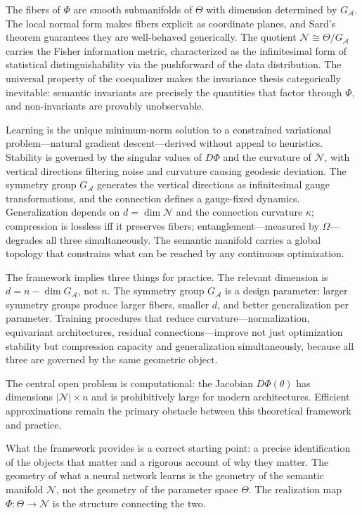 \documentclass[twocolumn,10pt]{article}
\theoremstyle{thmstyle}
\theoremstyle{defstyle}
\begin{document}
The fibers of $\Phi$ are smooth submanifolds of $\Theta$ with dimension
determined by $G_\mathcal{A}$. The local normal form makes fibers
explicit as coordinate planes, and Sard's theorem guarantees they are
well-behaved generically. The quotient $\mathcal{N} \cong
\Theta/G_\mathcal{A}$ carries the Fisher information metric,
characterized as the infinitesimal form of statistical distinguishability
via the pushforward of the data distribution. The universal property of
the coequalizer makes the invariance thesis categorically inevitable:
semantic invariants are precisely the quantities that factor through
$\Phi$, and non-invariants are provably unobservable.

Learning is the unique minimum-norm solution to a constrained variational
problem---natural gradient descent---derived without appeal to
heuristics. Stability is governed by the singular values of $D\Phi$ and
the curvature of $\mathcal{N}$, with vertical directions filtering noise
and curvature causing geodesic deviation. The symmetry group $G_\mathcal{A}$
generates the vertical directions as infinitesimal gauge transformations,
and the connection defines a gauge-fixed dynamics. Generalization depends
on $d = \dim\mathcal{N}$ and the connection curvature $\kappa$;
compression is lossless iff it preserves fibers; entanglement---measured
by $\Omega$---degrades all three simultaneously. The semantic manifold
carries a global topology that constrains what can be reached by any
continuous optimization.

The framework implies three things for practice. The relevant dimension
is $d = n - \dim G_\mathcal{A}$, not $n$. The symmetry group $G_\mathcal{A}$
is a design parameter: larger symmetry groups produce larger fibers,
smaller $d$, and better generalization per parameter. Training procedures
that reduce curvature---normalization, equivariant architectures,
residual connections---improve not just optimization stability but
compression capacity and generalization simultaneously, because all
three are governed by the same geometric object.

The central open problem is computational: the Jacobian $D\Phi(\theta)$
has dimensions $|\mathcal{N}| \times n$ and is prohibitively large for
modern architectures. Efficient approximations remain the primary
obstacle between this theoretical framework and practice.

What the framework provides is a correct starting point: a precise
identification of the objects that matter and a rigorous account of
why they matter. The geometry of what a neural network learns is the
geometry of the semantic manifold $\mathcal{N}$, not the geometry of
the parameter space $\Theta$. The realization map $\Phi : \Theta \to
\mathcal{N}$ is the structure connecting the two.
\end{document}
